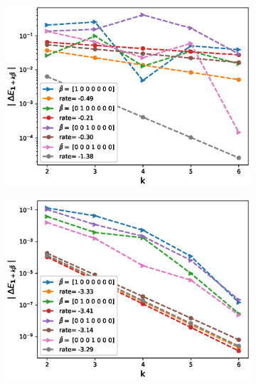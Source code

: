 \FloatBarrier
\begin{figure}[htb]
	\centering %
	\begin{subfigure}{0.4\textwidth}
		\includegraphics[width=\linewidth]{./figures/Heston_single_call_full_truncation_vol/mixed_rates/set5/N_4/first_difference_heston_4steps_hierarchical}
		\caption{}
		\label{fig:1}
	\end{subfigure}\hfil %
	\begin{subfigure}{0.4\textwidth}
		\includegraphics[width=\linewidth]{./figures/Heston_single_call_ABR_moment_matching/mixed_rates/set5/N_4/first_difference_heston_4steps_hierarchical}
		\caption{}
		\label{fig:2}
	\end{subfigure}\hfil %
		\begin{subfigure}{0.4\textwidth}

\end{subfigure}
\end{figure}
